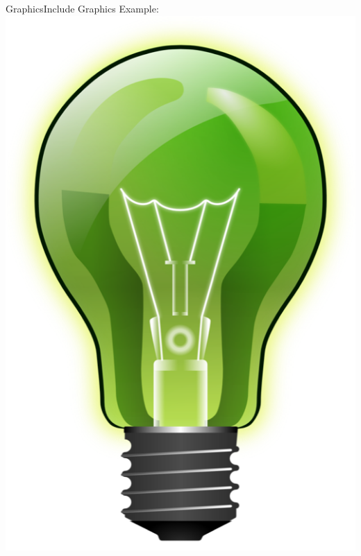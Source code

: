\documentclass{beamer}
\begin{document}
\begin{darkframes}
\begin{frame}[fragile]{Graphics}{Include Graphics}
	\alert{Example:} 
	\texttt{\includegraphics[scale=0.2]{images/bulb}}
	\begin{center}

\end{center}
\end{frame}
\end{darkframes}
\end{document}
